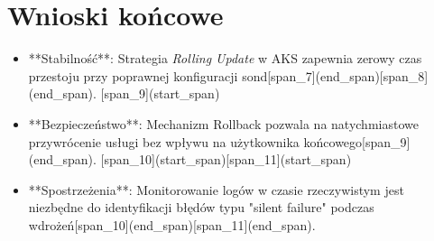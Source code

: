 \section{Wnioski końcowe}
\begin{itemize}
    [span_7](start_span)[span_8](start_span)\item **Stabilność**: Strategia \textit{Rolling Update} w AKS zapewnia zerowy czas przestoju przy poprawnej konfiguracji sond[span_7](end_span)[span_8](end_span).
    [span_9](start_span)\item **Bezpieczeństwo**: Mechanizm Rollback pozwala na natychmiastowe przywrócenie usługi bez wpływu na użytkownika końcowego[span_9](end_span).
    [span_10](start_span)[span_11](start_span)\item **Spostrzeżenia**: Monitorowanie logów w czasie rzeczywistym jest niezbędne do identyfikacji błędów typu "silent failure" podczas wdrożeń[span_10](end_span)[span_11](end_span).
\end{itemize}
